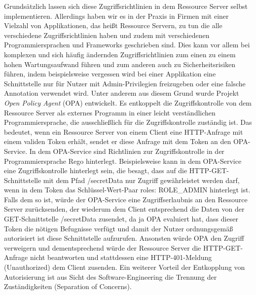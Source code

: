 Grundsätzlich lassen sich diese Zugriffsrichtlinien in dem Ressource Server selbst implementieren. Allerdings haben wir es in der Praxis in Firmen mit einer Vielzahl von Applikationen, das heißt Ressource Servern, zu tun die alle verschiedene Zugriffsrichtlinien haben und zudem mit verschiedenen Programmiersprachen und Frameworks geschrieben sind. Dies kann vor allem bei komplexen und sich häufig ändernden Zugriffsrichtlinien zum einen zu einem hohen Wartungsaufwand führen und zum anderen auch zu Sicherheitsrisiken führen, indem beispielsweise vergessen wird bei einer Applikation eine Schnittstelle nur für Nutzer mit Admin-Privilegien freizugeben oder eine falsche Annotation verwendet wird. 
Unter anderem aus diesem Grund wurde Projekt \emph{Open Policy Agent} (OPA) entwickelt. Es entkoppelt die Zugriffskontrolle von dem Ressource Server als externes Programm in einer leicht verständlichen Programmiersprache, die ausschließlich für die Zugriffskontrolle zuständig ist. Das bedeutet, wenn ein Ressource Server von einem Client eine HTTP-Anfrage mit einem validen Token erhält, sendet er diese Anfrage mit dem Token an den OPA-Service. In dem OPA-Service sind Richtlinien zur Zugriffskontrolle in der Programmiersprache Rego hinterlegt. Beispielsweise kann in dem OPA-Service eine Zugriffskontrolle hinterlegt sein, die besagt, dass auf die HTTP-GET-Schnittstelle mit dem Pfad /secretData nur Zugriff gewährleistet werden darf, wenn in dem Token das Schlüssel-Wert-Paar roles: ROLE\_ADMIN hinterlegt ist. Falls dem so ist, würde der OPA-Service eine Zugriffserlaubnis an den Ressource Server zurücksenden, der wiederum dem Client entsprechend die Daten von der GET-Schnittstelle /secretData zusendet, da ja OPA evaluiert hat, dass dieser Token die nötigen Befugnisse verfügt und damit der Nutzer ordnungsgemäß autorisiert ist diese Schnittstelle aufzurufen. Ansonsten würde \ac{OPA} den Zugriff verweigern und dementsprechend würde der Ressource Server die HTTP-GET-Anfrage nicht beantworten und stattdessen eine HTTP-401-Meldung (Unauthorized) dem Client zusenden. Ein weiterer Vorteil der Entkopplung von Autorisierung ist aus Sicht des Software-Engineering die Trennung der Zuständigkeiten (Separation of Concerns). 

%
%

